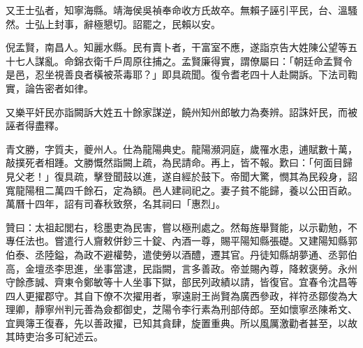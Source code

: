 \begin{pinyinscope}
又王士弘者，知寧海縣。靖海侯吳禎奉命收方氏故卒。無賴子誣引平民，台、溫騷然。士弘上封事，辭極懇切。詔罷之，民賴以安。

倪孟賢，南昌人。知麗水縣。民有賣卜者，干富室不應，遂詣京告大姓陳公望等五十七人謀亂。命錦衣衛千戶周原往捕之。孟賢廉得實，謂僚屬曰：「朝廷命孟賢令是邑，忍坐視善良者橫被茶毒耶？」即具疏聞。復令耆老四十人赴闕訴。下法司鞫實，論告密者如律。

又樂平奸民亦詣闕訴大姓五十餘家謀逆，饒州知州郎敏力為奏辨。詔誅奸民，而被誣者得盡釋。

青文勝，字質夫，夔州人。仕為龍陽典史。龍陽瀕洞庭，歲罹水患，逋賦數十萬，敲撲死者相踵。文勝慨然詣闕上疏，為民請命。再上，皆不報。歎曰：「何面目歸見父老！」復具疏，擊登聞鼓以進，遂自經於鼓下。帝聞大驚，憫其為民殺身，詔寬龍陽租二萬四千餘石，定為額。邑人建祠祀之。妻子貧不能歸，養以公田百畝。萬曆十四年，詔有司春秋致祭，名其祠曰「惠烈」。

贊曰：太祖起閭右，稔墨吏為民害，嘗以極刑處之。然每旌舉賢能，以示勸勉，不專任法也。嘗遣行人齎敕併鈔三十錠、內酒一尊，賜平陽知縣張礎。又建陽知縣郭伯泰、丞陸鎰，為政不避權勢，遣使勞以酒醴，遷其官。丹徒知縣胡夢通、丞郭伯高，金壇丞李思進，坐事當逮，民詣闕，言多善政。帝並賜內尊，降敕褒勞。永州守餘彥誠、齊東令鄭敏等十人坐事下獄，部民列政績以請，皆復官。宜春令沈昌等四人更擢郡守。其自下僚不次擢用者，寧遠尉王尚賢為廣西參政，祥符丞鄒俊為大理卿，靜寧州判元善為僉都御史，芝陽令李行素為刑部侍郎。至如懷寧丞陳希文、宜興簿王復春，先以善政擢，已知其貪肆，旋置重典。所以風厲激勸者甚至，以故其時吏治多可紀述云。


\end{pinyinscope}